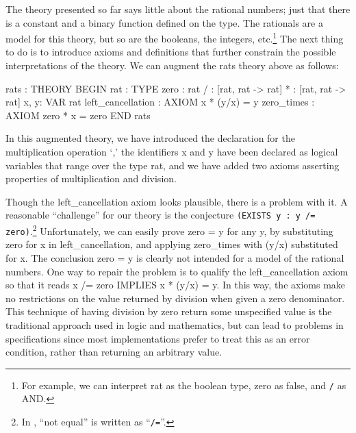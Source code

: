 The theory presented so far says little about the rational numbers; just
that there is a constant and a binary function defined on the type.  The
rationals are a model for this theory, but so are the booleans, the
integers, etc.\footnote{For example, we can interpret {\stt rat} as the
boolean type, {\stt zero} as {\sc false}, and {\tt /} as {\stt AND}.} The
next thing to do is to introduce axioms and definitions that further
constrain the possible interpretations of the theory.  We can
augment the {\stt rats} theory above as follows:
\begin{pvsex}
  rats : THEORY
   BEGIN
    rat : TYPE
    zero : rat
    / : [rat, rat -> rat]
    * : [rat, rat -> rat]
    x, y: VAR rat
    left\_cancellation : AXIOM x * (y/x)  = y
    zero\_times : AXIOM zero * x = zero
   END rats
\end{pvsex}
%
In this augmented theory, we have introduced the declaration for the
multiplication operation `{\tt *},' the identifiers {\stt x} and {\stt y}
have been declared as logical variables that range over the type {\stt
rat}, and we have added two axioms asserting properties of
multiplication and division.

Though the {\stt left\_cancellation} axiom looks plausible, there is a
problem with it.  A reasonable ``challenge'' for our theory is the
conjecture {\tt (EXISTS y : y /= zero)}.\footnote{In \pvs, ``not equal''
is written as ``{\tt /=}''.} Unfortunately, we can easily prove {\stt
zero = y} for any {\stt y}, by substituting {\stt zero} for {\stt x} in
{\stt left\_cancellation}, and applying {\stt zero\_times} with {\stt
(y/x)} substituted for {\stt x}.  The conclusion {\stt zero = y} is
clearly not intended for a model of the rational numbers.  One way to
repair the problem is to qualify the {\stt left\_cancellation} axiom so
that it reads {\stt x /= zero IMPLIES x * (y/x) = y}. In this way, the
axioms make no restrictions on the value returned by division when given
a zero denominator.  This technique of having division by zero return
some unspecified value is the traditional approach used in logic and
mathematics, but can lead to problems in specifications since most
implementations prefer to treat this as an error condition, rather than
returning an arbitrary value.

